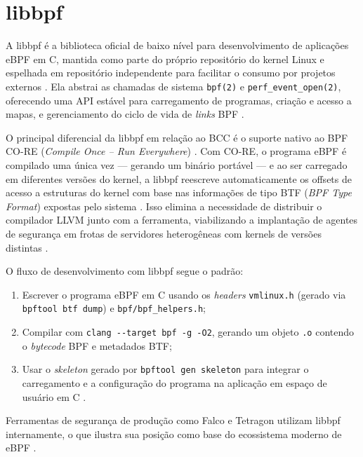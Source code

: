 \section{libbpf}
\label{sec:libbpf}

A libbpf é a biblioteca oficial de baixo nível para desenvolvimento de aplicações
eBPF em C, mantida como parte do próprio repositório do kernel Linux e espelhada
em repositório independente para facilitar o consumo por projetos externos
\cite{libbpf}.
Ela abstrai as chamadas de sistema \texttt{bpf(2)} e \texttt{perf\_event\_open(2)},
oferecendo uma API estável para carregamento de programas, criação e acesso a mapas,
e gerenciamento do ciclo de vida de \textit{links} BPF \cite{linuxkernel2024}.

O principal diferencial da libbpf em relação ao BCC é o suporte nativo ao BPF
CO-RE (\textit{Compile Once -- Run Everywhere}) \cite{nakryiko2020}.
Com CO-RE, o programa eBPF é compilado uma única vez --- gerando um binário
portável --- e ao ser carregado em diferentes versões do kernel, a libbpf reescreve
automaticamente os offsets de acesso a estruturas do kernel com base nas informações
de tipo BTF (\textit{BPF Type Format}) expostas pelo sistema \cite{linuxkernel2024}.
Isso elimina a necessidade de distribuir o compilador LLVM junto com a ferramenta,
viabilizando a implantação de agentes de segurança em frotas de servidores
heterogêneas com kernels de versões distintas \cite{nakryiko2020}.

O fluxo de desenvolvimento com libbpf segue o padrão:

\begin{enumerate}
  \item Escrever o programa eBPF em C usando os \textit{headers}
        \texttt{vmlinux.h} (gerado via \texttt{bpftool btf dump}) e
        \texttt{bpf/bpf\_helpers.h};
  \item Compilar com \texttt{clang -{}-target bpf -g -O2}, gerando um objeto
        \texttt{.o} contendo o \textit{bytecode} BPF e metadados BTF;
  \item Usar o \textit{skeleton} gerado por \texttt{bpftool gen skeleton} para
        integrar o carregamento e a configuração do programa na aplicação em
        espaço de usuário em C \cite{libbpf}.
\end{enumerate}

Ferramentas de segurança de produção como Falco e Tetragon utilizam libbpf
internamente, o que ilustra sua posição como base do ecossistema moderno de eBPF
\cite{linuxkernel2024}.

